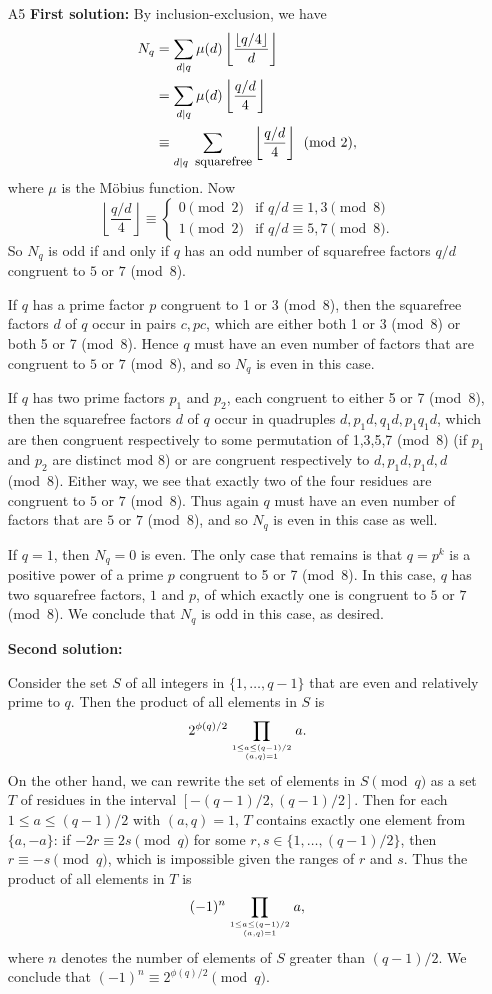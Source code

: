 \documentclass[amssymb,twocolumn,pra,10pt,aps]{revtex4-1}
\begin{document}
\begin{itemize}
\item[A5]
\textbf{First solution:}
By inclusion-exclusion, we have
\begin{align*}
N_q    &= \sum_{d|q} \mu(d) \left\lfloor \frac{\lfloor q/4\rfloor}{d} \right\rfloor \\
       &= \sum_{d|q} \mu(d) \left\lfloor \frac{q/d}{4} \right\rfloor \\
  &\equiv \sum_{d|q \mbox{\, \small squarefree}} \left\lfloor \frac{q/d}{4}  \right\rfloor  \pmod{2},
\end{align*}
where $\mu$ is the M\"obius function.
Now
\[
\left\lfloor \frac{q/d}{4} \right\rfloor \equiv \begin{cases} 0 \pmod{2} & \mbox{if } q/d\equiv 1, 3 \pmod{8} \\
1 \pmod{2} & \mbox{if } q/d\equiv 5, 7 \pmod{8}.
\end{cases}
\]
So $N_q$ is odd if and only if $q$ has an odd number of squarefree factors $q/d$ congruent to $5$ or $7$ (mod~8).

If $q$ has a prime factor $p$ congruent to 1 or 3 (mod~8), then the squarefree factors $d$ of $q$ occur in pairs $c,pc$, which are either both 1 or 3 (mod~8) or both 5 or 7 (mod~8).  Hence $q$ must have an even number of factors that are congruent to $5$ or $7$ (mod~8), and so $N_q$ is even in this case.

If $q$ has two prime factors $p_1$ and $p_2$, each congruent to either 5 or 7 (mod~8), then the squarefree factors $d$ of $q$ occur in quadruples $d,p_1d,q_1d,p_1q_1d$, which are then congruent respectively to some permutation of 1,3,5,7 (mod~8) (if $p_1$ and $p_2$ are distinct mod 8) or are congruent respectively to $d,p_1d,p_1d,d$ (mod~8). Either way, we see that exactly two of the four residues are congruent to $5$ or $7$ (mod~8).  Thus again $q$ must have an even number of factors that are $5$ or $7$ (mod~8), and so $N_q$ is even in this case as well.

If $q=1$, then $N_q=0$ is even.  The only case that remains is that $q=p^k$ is a positive power of a prime $p$ congruent to 5 or 7 (mod~8).  In this case, $q$ has two squarefree factors, $1$ and $p$, of which exactly one is congruent to $5$ or $7$ (mod~8).  We conclude that $N_q$ is odd in this case, as desired.

\noindent
\textbf{Second solution:}

Consider the set $S$ of all integers in $\{1,\ldots,q-1\}$ that are even and relatively prime to $q$.  Then the product of all elements in $S$ is
\[
2^{\phi(q)/2}\prod_{{1\leq a\leq (q-1)/2}\atop{(a,q)=1}} a.
\]
On the other hand, we can rewrite the set of elements in $S \pmod{q}$ as a set $T$ of residues in the interval $[-(q-1)/2,(q-1)/2]$.  Then for each $1\leq a\leq (q-1)/2$ with $(a,q)=1$, $T$ contains exactly one element from $\{a,-a\}$: if $-2r \equiv 2s \pmod{q}$ for some $r,s\in\{1,\ldots,(q-1)/2\}$, then $r \equiv -s \pmod{q}$, which is impossible given the ranges of $r$ and $s$.  Thus the product of all elements in $T$ is
\[
(-1)^n \prod_{{1\leq a\leq (q-1)/2}\atop{(a,q)=1}} a,
\]
where $n$ denotes the number of elements of $S$ greater than $(q-1)/2$.
We conclude that $(-1)^n \equiv 2^{\phi(q)/2} \pmod{q}$.


\end{itemize}
\end{document}
